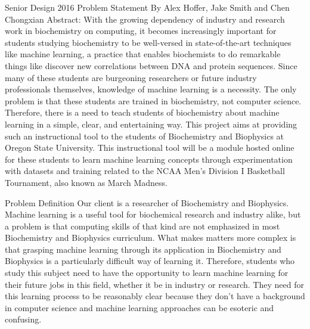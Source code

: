 \documentclass[letterpaper,20pt,titlepage]{article}
\begin{document}
\begin{center}

Senior Design 2016
\bigbreak
Problem Statement
\bigbreak
By Alex Hoffer, Jake Smith and Chen Chongxian
\bigbreak
Abstract:
\newline
With the growing dependency of industry and research work in biochemistry on computing, it becomes increasingly important for students studying biochemistry to be well-versed in state-of-the-art techniques like machine learning, a practice that enables biochemists to do remarkable things like discover new correlations between DNA and protein sequences. Since many of these students are burgeoning researchers or future industry professionals themselves, knowledge of machine learning is a necessity. The only problem is that these students are trained in biochemistry, not computer science. Therefore, there is a need to teach students of biochemistry about machine learning in a simple, clear, and entertaining way. This project aims at providing such an instructional tool to the students of Biochemistry and Biophysics at Oregon State University. This instructional tool will be a module hosted online for these students to learn machine learning concepts through experimentation with datasets and training related to the NCAA Men’s Division I Basketball Tournament, also known as March Madness. 
\newpage
\end{center}





\begin{section}{Problem Definition}
Our client is a researcher of Biochemistry and Biophysics. Machine learning is a useful tool for biochemical research and industry alike, but a problem is that computing skills of that kind are not emphasized in most Biochemistry and Biophysics curriculum. What makes matters more complex is that grasping machine learning through its application in Biochemistry and Biophysics is a particularly difficult way of learning it. Therefore, students who study this subject need to have the opportunity to learn machine learning for their future jobs in this field, whether it be in industry or research. They need for this learning process to be reasonably clear because they don’t have a background in computer science and machine learning approaches can be esoteric and confusing. 
\end{section}
\end{document}
